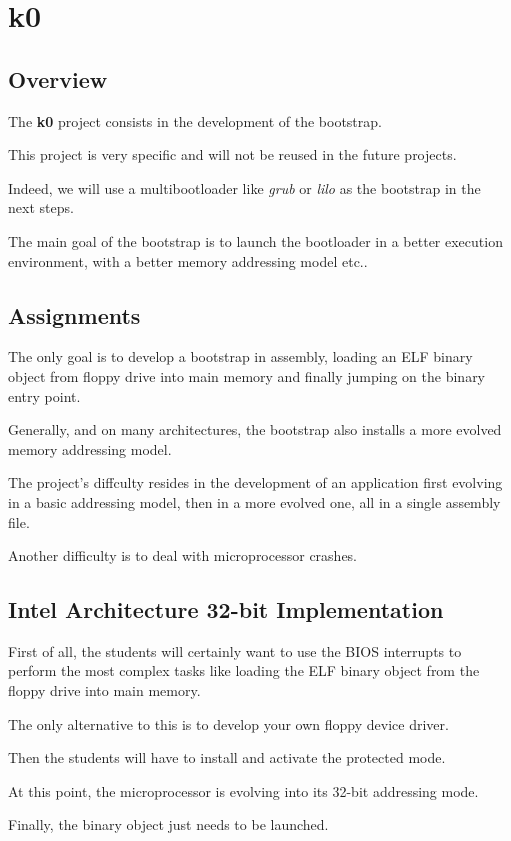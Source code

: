 
%
%

\section{k0}

%
%

\subsection{Overview}

The \textbf{k0} project consists in the development of the bootstrap.

This project is very specific and will not be reused in the future
projects.

Indeed, we will use a multibootloader like \textit{grub} or \textit{lilo}
as the bootstrap in the next steps.

The main goal of the bootstrap is to launch the bootloader in a better
execution environment, with a better memory addressing model etc..

%
%

\subsection{Assignments}

The only  goal is to develop  a bootstrap in assembly,  loading an ELF
binary object from  floppy drive into main memory  and finally jumping
on the binary entry point.

Generally, and on many architectures, the bootstrap also installs
a more evolved memory addressing model.

The project's diffculty resides in the development of an
application first evolving in a basic addressing model, then in
a more evolved one, all in a single assembly file.

Another difficulty is to deal with microprocessor crashes.

%
%

\subsection{Intel Architecture 32-bit Implementation}

First of all, the students will certainly want to use the BIOS interrupts
to perform the most complex tasks like loading the ELF binary object
from the floppy drive into main memory.

The only alternative to this is to develop your own floppy device driver.

Then the students will have to install and activate the protected mode.

At this point, the microprocessor is evolving into its 32-bit addressing
mode.

Finally, the binary object just needs to be launched.
